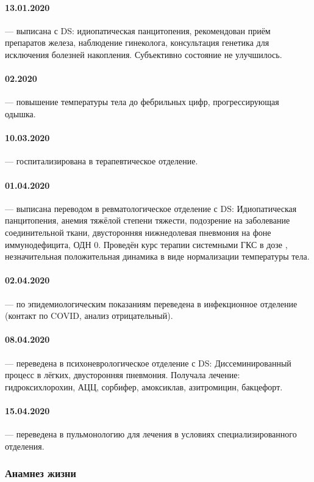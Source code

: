 \documentclass[a4paper,14pt]{extarticle}
\newcommand{\mg}{мг}
\begin{document}
\paragraph{13.01.2020} --- выписана с DS: идиопатическая панцитопения, рекомендован приём препаратов железа, наблюдение гинеколога, консультация генетика для исключения болезней накопления.
Субъективно состояние не улучшилось.
\paragraph{02.2020} --- повышение температуры тела до фебрильных цифр, прогрессирующая одышка.
\paragraph{10.03.2020} --- госпитализирована в терапевтическое отделение.
\paragraph{01.04.2020} --- выписана переводом в ревматологическое отделение с DS: Идиопатическая панцитопения, анемия тяжёлой степени тяжести, подозрение на заболевание соединительной ткани, двусторонняя нижнедолевая пневмония на фоне иммунодефицита, ОДН 0.
Проведён курс терапии системными ГКС в дозе \numprint[\mg]{35}, незначительная положительная динамика в виде нормализации температуры тела.
\paragraph{02.04.2020} --- по эпидемиологическим показаниям переведена в инфекционное отделение (контакт по COVID, анализ отрицательный).
\paragraph{08.04.2020} --- переведена в психоневрологическое отделение с DS: Диссеминированный процесс в лёгких, двусторонняя пневмония.
Получала лечение: гидроксихлорохин, АЦЦ, сорбифер, амоксиклав, азитромицин, бакцефорт.
\paragraph{15.04.2020} --- переведена в пульмонологию для лечения в условиях специализированного отделения.

\subsubsection*{Анамнез жизни}
\end{document}
